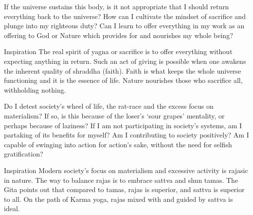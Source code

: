 


\newpage
\begin{mananam}{} 
\mananamtext If the universe sustains this body, is it not appropriate that I should return everything back to the universe? How can I cultivate the mindset of sacrifice and plunge into my righteous duty? Can I learn to offer everything in my work as an offering to God or Nature which provides for and nourishes my whole being?
\end{mananam}
\WritingHand{}
\begin{inspiration}{\mananamfont Inspiration}
\mananamtext The real spirit of yagna or sacrifice is to offer everything without expecting anything in return. Such an act of giving is possible when one awakens the inherent quality of shraddha (faith). Faith is what keeps the whole universe functioning and it is the essence of life. Nature nourishes those who sacrifice all, withholding nothing.  
\end{inspiration}
\newpage


\newpage
\begin{mananam}{} 
\mananamtext Do I detest society’s wheel of life, the rat-race and the excess focus on materialism? If so, is this because of the loser’s ‘sour grapes’ mentality, or perhaps because of laziness? If I am not participating in society’s systems, am I partaking of its benefits for myself? Am I contributing to society positively? Am I capable of swinging into action for action’s sake, without the need for selfish gratification?
\end{mananam}
\WritingHand{}
\begin{inspiration}{\mananamfont Inspiration}
\mananamtext Modern society’s focus on materialism and excessive activity is rajasic in nature. The way to balance rajas is to embrace sattva and shun tamas. The Gita points out that compared to tamas, rajas is superior, and sattva is superior to all. On the path of Karma yoga, rajas mixed with and guided by sattva is ideal.
\end{inspiration}
\newpage

